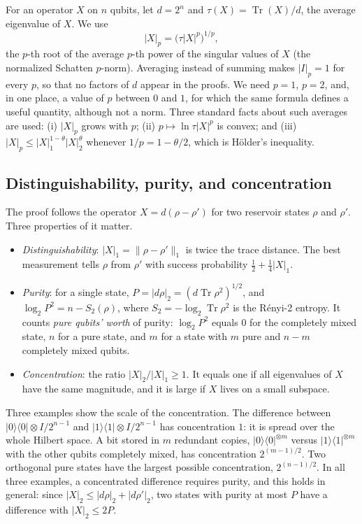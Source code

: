 \documentclass[aps,prl,twocolumn,superscriptaddress,floatfix]{revtex4-2}
\theoremstyle{plain}
\newcommand{\tr}{\operatorname{Tr}}
\newcommand{\ketbra}[2]{|#1\rangle\!\langle #2|}
\newcommand{\nrm}[2]{\lvert #1\rvert_{#2}}
\newcommand{\Norm}[1]{\lVert #1\rVert}
\begin{document}
For an operator $X$ on $n$ qubits, let $d=2^n$ and $\tau(X)=\tr(X)/d$, the average eigenvalue of $X$. We use
\begin{equation}
\nrm Xp=\bigl(\tau|X|^p\bigr)^{1/p},
\label{eq:S-norm}
\end{equation}
the $p$-th root of the average $p$-th power of the singular values of $X$ (the normalized Schatten $p$-norm). Averaging instead of summing makes $\nrm Ip=1$ for every $p$, so that no factors of $d$ appear in the proofs. We need $p=1$, $p=2$, and, in one place, a value of $p$ between $0$ and $1$, for which the same formula defines a useful quantity, although not a norm. Three standard facts about such averages are used: (i) $\nrm Xp$ grows with $p$; (ii) $p\mapsto\ln\tau|X|^p$ is convex; and (iii) $\nrm Xp\le\nrm X1^{1-\theta}\nrm X2^{\theta}$ whenever $1/p=1-\theta/2$, which is H\"older's inequality.

\subsection{Distinguishability, purity, and concentration}

The proof follows the operator $X=d(\rho-\rho')$ for two reservoir states $\rho$ and $\rho'$. Three properties of it matter.
\begin{itemize}
\item \emph{Distinguishability}: $\nrm X1=\Norm{\rho-\rho'}_1$ is twice the trace distance. The best measurement tells $\rho$ from $\rho'$ with success probability $\frac12+\frac14\nrm X1$.
\item \emph{Purity}: for a single state, $P=\nrm{d\rho}2=(d\tr\rho^2)^{1/2}$, and $\log_2P^2=n-S_2(\rho)$, where $S_2=-\log_2\tr\rho^2$ is the R\'enyi-2 entropy. It counts \emph{pure qubits' worth} of purity: $\log_2P^2$ equals $0$ for the completely mixed state, $n$ for a pure state, and $m$ for a state with $m$ pure and $n-m$ completely mixed qubits.
\item \emph{Concentration}: the ratio $\nrm X2/\nrm X1\ge1$. It equals one if all eigenvalues of $X$ have the same magnitude, and it is large if $X$ lives on a small subspace.
\end{itemize}
Three examples show the scale of the concentration. The difference between $\ketbra00\otimes I/2^{n-1}$ and $\ketbra11\otimes I/2^{n-1}$ has concentration $1$: it is spread over the whole Hilbert space. A bit stored in $m$ redundant copies, $\ketbra00^{\otimes m}$ versus $\ketbra11^{\otimes m}$ with the other qubits completely mixed, has concentration $2^{(m-1)/2}$. Two orthogonal pure states have the largest possible concentration, $2^{(n-1)/2}$. In all three examples, a concentrated difference requires purity, and this holds in general: since $\nrm X2\le\nrm{d\rho}2+\nrm{d\rho'}2$, two states with purity at most $P$ have a difference with $\nrm X2\le2P$.
\end{document}
